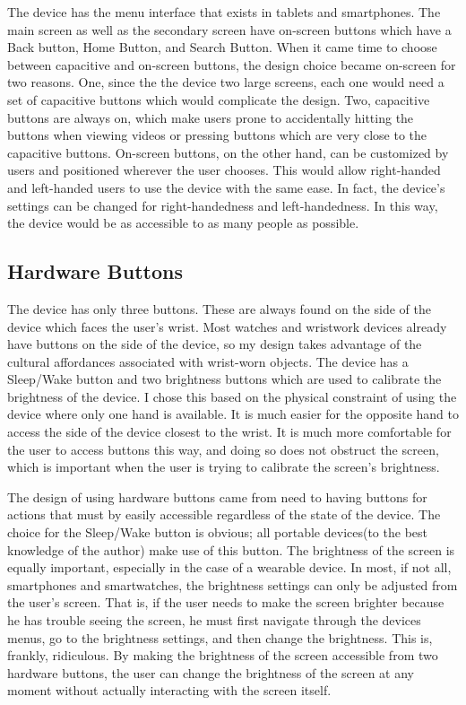 \documentclass[11pt]{article}
\begin{document}
The device has the menu interface that exists in tablets and smartphones. The main screen as well as the secondary screen have on-screen buttons which have a Back button, Home Button, and Search Button. When it came time to choose between capacitive and on-screen buttons, the design choice became on-screen for two reasons. One, since the the device two large screens, each one would need a set of capacitive buttons which would complicate the design. Two, capacitive buttons are always on, which make users prone to accidentally hitting the buttons when viewing videos or pressing buttons which are very close to the capacitive buttons. On-screen buttons, on the other hand, can be customized by users and positioned wherever the user chooses. This would allow right-handed and left-handed users to use the device with the same ease. In fact, the device's settings can be changed for right-handedness and left-handedness. In this way, the device would be as accessible to as many people as possible.

\subsection{Hardware Buttons}
The device has only three buttons. These are always found on the side of the device which faces the user's wrist. Most watches and wristwork devices already have buttons on the side of the device, so my design takes advantage of the cultural affordances associated with wrist-worn objects. The device has a Sleep/Wake button and two brightness buttons which are used to calibrate the brightness of the device. I chose this based on the physical constraint of using the device where only one hand is available. It is much easier for the opposite hand to access the side of the device closest to the wrist. It is much more comfortable for the user to access buttons this way, and doing so does not obstruct the screen, which is important when the user is trying to calibrate the screen's brightness. 

The design of using hardware buttons came from need to having buttons for actions that must by easily accessible regardless of the state of the device. The choice for the Sleep/Wake button is obvious; all portable devices(to the best knowledge of the author) make use of this button. The brightness of the screen is equally important, especially in the case of a wearable device. In most, if not all, smartphones and smartwatches, the brightness settings can only be adjusted from the user's screen. That is, if the user needs to make the screen brighter because he has trouble seeing the screen, he must first navigate through the devices menus, go to the brightness settings, and then change the brightness. This is, frankly, ridiculous. By making the brightness of the screen accessible from two hardware buttons, the user can change the brightness of the screen at any moment without actually interacting with the screen itself.
\end{document}
